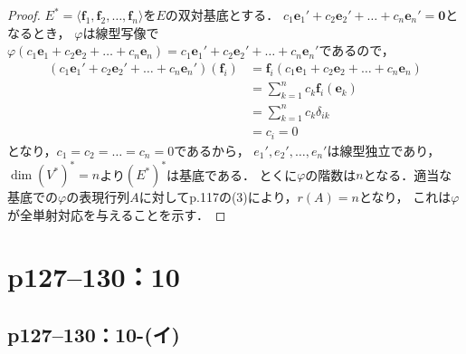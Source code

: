 \documentclass[a4paper,10pt,fleqn]{ltjsarticle}
\begin{document}
\begin{tleftbar}
\begin{proof}
    $ E^\ast = \langle \bm{f}_1 , \bm{f}_2 , \dots , \bm{f}_n \rangle$を$E$の双対基底とする．
    $ c_1 \bm{e}_1 ' + c_2 \bm{e}_2 ' + \dots + c_n \bm{e}_n ' = \bm{0}$となるとき，
    $\varphi$は線型写像で$\varphi (c_1 \bm{e}_1 + c_2 \bm{e}_2 + \dots + c_n \bm{e}_n) = c_1 \bm{e}_1 ' + c_2 \bm{e}_2 ' + \dots + c_n \bm{e}_n '$であるので，
    \begin{align*}
      (c_1 \bm{e}_1 ' + c_2 \bm{e}_2 ' + \dots + c_n \bm{e}_n ') (\bm{f}_i) & = \bm{f}_i (c_1 \bm{e}_1 + c_2 \bm{e}_2 + \dots + c_n \bm{e}_n) \\
                                                                            & = \sum_{k=1}^{n} c_k \bm{f}_i (\bm{e}_k)                        \\
                                                                            & = \sum_{k=1}^{n} c_k \delta_{ik}                                \\
                                                                            & = c_i=0
    \end{align*}
    となり，$c_1 = c_2 = \dots = c_n = 0$であるから，
    $e_1 ' , e_2 ' , \dots , e_n '$は線型独立であり，
    $\dim (V^\ast)^\ast = n $より$(E^\ast)^\ast$は基底である．
    とくに$\varphi$の階数は$n$となる．適当な基底での$\varphi$の表現行列$A$に対してp.117の(3)により，$r(A)=n$となり，
    これは$\varphi$が全単射対応を与えることを示す．
  \end{proof}
\end{tleftbar}


\newpage


\section*{p127--130：10}


\subsection*{p127--130：10-(イ)}
\end{document}
